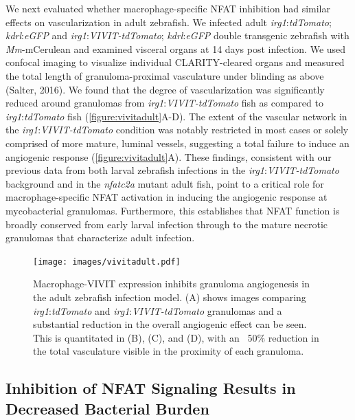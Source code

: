 We next evaluated whether macrophage-specific NFAT inhibition had similar effects on vascularization in adult zebrafish. We infected adult \textit{irg1}:\textit{tdTomato}; \textit{kdrl}:\textit{eGFP} and \textit{irg1}:\textit{VIVIT-tdTomato}; \textit{kdrl}:\textit{eGFP} double transgenic zebrafish with \textit{Mm}-mCerulean and examined visceral organs at 14 days post infection. We used confocal imaging to visualize individual CLARITY-cleared organs and measured the total length of granuloma-proximal vasculature under blinding as above (Salter, 2016). We found that the degree of vascularization was significantly reduced around granulomas from \textit{irg1}:\textit{VIVIT-tdTomato} fish as compared to \textit{irg1}:\textit{tdTomato} fish (\autoref{figure:vivitadult}A-D). The extent of the vascular network in the \textit{irg1}:\textit{VIVIT-tdTomato} condition was notably restricted in most cases or solely comprised of more mature, luminal vessels, suggesting a total failure to induce an angiogenic response (\autoref{figure:vivitadult}A). These findings, consistent with our previous data from both larval zebrafish infections in the \textit{irg1}:\textit{VIVIT-tdTomato} background and in the \textit{nfatc2a} mutant adult fish, point to a critical role for macrophage-specific NFAT activation in inducing the angiogenic response at mycobacterial granulomas. Furthermore, this establishes that NFAT function is broadly conserved from early larval infection through to the mature necrotic granulomas that characterize adult infection.

\begin{figure}
\centering
\texttt{[image: images/vivitadult.pdf]}
\caption{Macrophage-VIVIT expression inhibits granuloma angiogenesis in the adult zebrafish infection model. (A) shows images comparing \textit{irg1}:\textit{tdTomato} and \textit{irg1}:\textit{VIVIT-tdTomato} granulomas and a substantial reduction in the overall angiogenic effect can be seen. This is quantitated in (B), (C), and (D), with an ~50\% reduction in the total vasculature visible in the proximity of each granuloma.}
\label{figure:vivitadult}
\end{figure}

\subsection{Inhibition of NFAT Signaling Results in Decreased Bacterial Burden}

